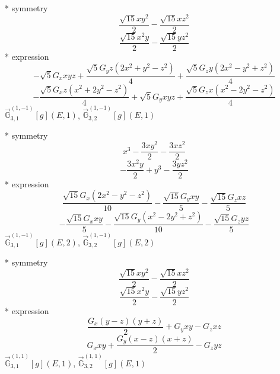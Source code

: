 \documentclass[fleqn,8pt]{jsarticle}
\begin{document}
\noindent\quad ** symmetry
\begin{dmath*}
\frac{\sqrt{15} x y^{2}}{2} - \frac{\sqrt{15} x z^{2}}{2}
\end{dmath*}
\begin{dmath*}
\frac{\sqrt{15} x^{2} y}{2} - \frac{\sqrt{15} y z^{2}}{2}
\end{dmath*}
\noindent\quad ** expression
\begin{dmath*}
- \sqrt{5} G_{x} x y z + \frac{\sqrt{5} G_{y} z \left(2 x^{2} + y^{2} - z^{2}\right)}{4} + \frac{\sqrt{5} G_{z} y \left(2 x^{2} - y^{2} + z^{2}\right)}{4}
\end{dmath*}
\begin{dmath*}
- \frac{\sqrt{5} G_{x} z \left(x^{2} + 2 y^{2} - z^{2}\right)}{4} + \sqrt{5} G_{y} x y z + \frac{\sqrt{5} G_{z} x \left(x^{2} - 2 y^{2} - z^{2}\right)}{4}
\end{dmath*}
\noindent\quad $\vec{\mathbb{G}}_{3,1}^{(1,-1)}[g](E,1)$, $\vec{\mathbb{G}}_{3,2}^{(1,-1)}[g](E,1)$

\noindent\quad ** symmetry
\begin{dmath*}
x^{3} - \frac{3 x y^{2}}{2} - \frac{3 x z^{2}}{2}
\end{dmath*}
\begin{dmath*}
- \frac{3 x^{2} y}{2} + y^{3} - \frac{3 y z^{2}}{2}
\end{dmath*}
\noindent\quad ** expression
\begin{dmath*}
\frac{\sqrt{15} G_{x} \left(2 x^{2} - y^{2} - z^{2}\right)}{10} - \frac{\sqrt{15} G_{y} x y}{5} - \frac{\sqrt{15} G_{z} x z}{5}
\end{dmath*}
\begin{dmath*}
- \frac{\sqrt{15} G_{x} x y}{5} - \frac{\sqrt{15} G_{y} \left(x^{2} - 2 y^{2} + z^{2}\right)}{10} - \frac{\sqrt{15} G_{z} y z}{5}
\end{dmath*}
\noindent\quad $\vec{\mathbb{G}}_{3,1}^{(1,-1)}[g](E,2)$, $\vec{\mathbb{G}}_{3,2}^{(1,-1)}[g](E,2)$

\noindent\quad ** symmetry
\begin{dmath*}
\frac{\sqrt{15} x y^{2}}{2} - \frac{\sqrt{15} x z^{2}}{2}
\end{dmath*}
\begin{dmath*}
\frac{\sqrt{15} x^{2} y}{2} - \frac{\sqrt{15} y z^{2}}{2}
\end{dmath*}
\noindent\quad ** expression
\begin{dmath*}
\frac{G_{x} \left(y - z\right) \left(y + z\right)}{2} + G_{y} x y - G_{z} x z
\end{dmath*}
\begin{dmath*}
G_{x} x y + \frac{G_{y} \left(x - z\right) \left(x + z\right)}{2} - G_{z} y z
\end{dmath*}
\noindent\quad $\vec{\mathbb{G}}_{3,1}^{(1,1)}[g](E,1)$, $\vec{\mathbb{G}}_{3,2}^{(1,1)}[g](E,1)$
\end{document}
